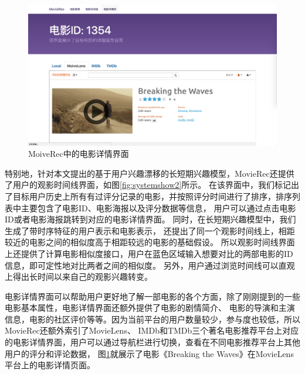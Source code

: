 \begin{figure}[htbp]
\centering
\includegraphics[scale=0.16]{images/systemshow3.jpeg}
\caption{MoiveRec中的电影详情界面}
\label{fig:systemshow3}
\end{figure}

特别地，针对本文提出的基于用户兴趣漂移的长短期兴趣模型，MovieRec还提供了用户的观影时间线界面，如图\ref{fig:systemshow2}所示。
在该界面中，我们标记出了目标用户历史上所有有过评分记录的电影，并按照评分时间进行了排序，排序列表中主要包含了电影ID、电影海报以及评分数据等信息，
用户可以通过点击电影ID或者电影海报跳转到对应的电影详情界面。
同时，在长短期兴趣模型中，我们生成了带时序特征的用户表示和电影表示，
还提出了同一个观影时间线上，相距较近的电影之间的相似度高于相距较远的电影的基础假设。
所以观影时间线界面上还提供了计算电影相似度接口，用户在蓝色区域输入想要对比的两部电影的ID信息，即可定性地对比两者之间的相似度。
另外，用户通过浏览时间线可以直观上得出长时间以来自己的观影兴趣转变。

电影详情界面可以帮助用户更好地了解一部电影的各个方面，除了刚刚提到的一些电影基本属性，电影详情界面还额外提供了电影的剧情简介、
电影的导演和主演信息，电影的社区评价等等。因为当前平台的用户数量较少，参与度也较低，所以MovieRec还额外索引了MovieLens、
IMDb和TMDb三个著名电影推荐平台上对应的电影详情界面，用户可以通过导航栏进行切换，查看在不同电影推荐平台上其他用户的评分和评论数据，
图\ref{fig:systemshow3}就展示了电影《Breaking the Waves》在MovieLens平台上的电影详情页面。



